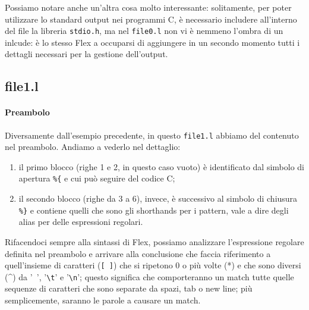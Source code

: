 \documentclass[class=book, crop=false, oneside, 12pt]{standalone}
\begin{document}
Possiamo notare anche un'altra cosa molto interessante: solitamente, per poter utilizzare lo standard output nei programmi C, è necessario includere all'interno del file la libreria \texttt{stdio.h}, ma nel \texttt{file0.l} non vi è nemmeno l'ombra di un inlcude: è lo stesso Flex a occuparsi di aggiungere in un secondo momento tutti i dettagli necessari per la gestione dell'output.

\subsection*{file1.l}


\paragraph{Preambolo}
Diversamente dall'esempio precedente, in questo \texttt{file1.l} abbiamo del contenuto nel preambolo. Andiamo a vederlo nel dettaglio:

\begin{enumerate}
    \item il primo blocco (righe 1 e 2, in questo caso vuoto) è identificato dal simbolo di apertura \texttt{\%\{} e cui può seguire del codice C;
    \item il secondo blocco (righe da 3 a 6), invece, è successivo al simbolo di chiusura \texttt{\%\}} e contiene quelli che sono gli shorthands per i pattern, vale a dire degli alias per delle espressioni regolari.
\end{enumerate}

Rifacendoci sempre alla sintassi di Flex, possiamo analizzare l'espressione regolare definita nel preambolo e arrivare alla conclusione che faccia riferimento a quell'insieme di caratteri (\texttt{[ ]}) che si ripetono \(0\) o più volte (*) e che sono diversi (\^{}) da '\texttt{ }', '\texttt{\textbackslash t}' e '\texttt{\textbackslash n}'; questo significa che comporteranno un match tutte quelle sequenze di caratteri che sono separate da spazi, tab o new line; più semplicemente, saranno le parole a causare un match.
\end{document}
